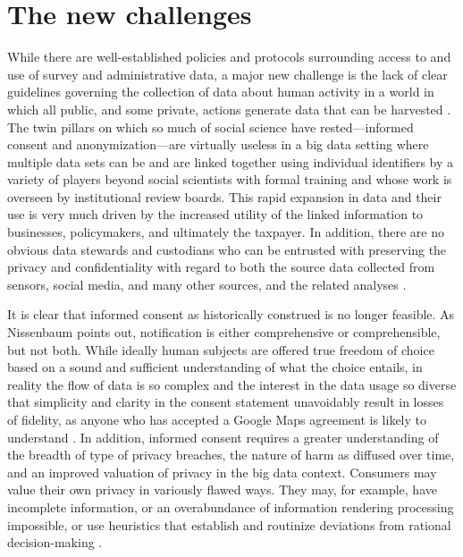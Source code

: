 \documentclass[]{krantz}
\begin{document}
\section{The new challenges}\label{the-new-challenges}

While there are well-established policies and protocols surrounding
access to and use of survey and administrative data, a major new
challenge is the lack of clear guidelines governing the collection of
data about human activity in a world in which all public, and some
private, actions generate data that can be harvested
\citep{house2014big, ohm2010broken, Strandburg2014}. The twin pillars on
which so much of social science have rested---informed consent and
anonymization---are virtually useless in a big data setting where
multiple data sets can be and are linked together using individual
identifiers by a variety of players beyond social scientists with formal
training and whose work is overseen by institutional review boards. This
rapid expansion in data and their use is very much driven by the
increased utility of the linked information to businesses, policymakers,
and ultimately the taxpayer. In addition, there are no obvious data
stewards and custodians who can be entrusted with preserving the privacy
and confidentiality with regard to both the source data collected from
sensors, social media, and many other sources, and the related analyses
\citep{lane2013me}.

It is clear that informed consent as historically construed is no longer
feasible. As Nissenbaum \citeyearpar{nissenbaum2011contextual} points
out, notification is either comprehensive or comprehensible, but not
both. While ideally human subjects are offered true freedom of choice
based on a sound and sufficient understanding of what the choice
entails, in reality the flow of data is so complex and the interest in
the data usage so diverse that simplicity and clarity in the consent
statement unavoidably result in losses of fidelity, as anyone who has
accepted a Google Maps agreement is likely to understand
\citep{check2015researchers}. In addition, informed consent requires a
greater understanding of the breadth of type of privacy breaches, the
nature of harm as diffused over time, and an improved valuation of
privacy in the big data context. Consumers may value their own privacy
in variously flawed ways. They may, for example, have incomplete
information, or an overabundance of information rendering processing
impossible, or use heuristics that establish and routinize deviations
from rational decision-making \citep{Acquisti2014}.
\end{document}
